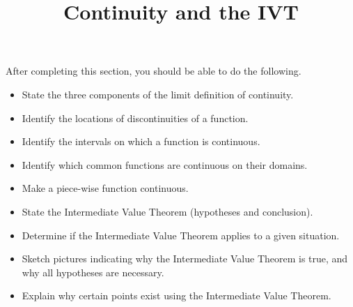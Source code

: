 \documentclass{ximera}
\title{Continuity and the IVT}
\begin{document}
\begin{abstract}
\end{abstract}

\maketitle

\begin{sectionOutcomes}
After completing this section, you should be able to do the following.

\begin{itemize}
\item State the three components of the limit definition of continuity. 
\item Identify the locations of discontinuities of a function. 
\item Identify the intervals on which a function is continuous.
\item Identify which common functions are continuous on their domains.
\item Make a piece-wise function continuous.
\item State the Intermediate Value Theorem (hypotheses and conclusion).
\item Determine if the Intermediate Value Theorem applies to a given situation.
\item Sketch pictures indicating why the Intermediate Value Theorem is
  true, and why all hypotheses are necessary.
\item Explain why certain points exist using the Intermediate Value
  Theorem.
\end{itemize}

\end{sectionOutcomes}
\end{document}
